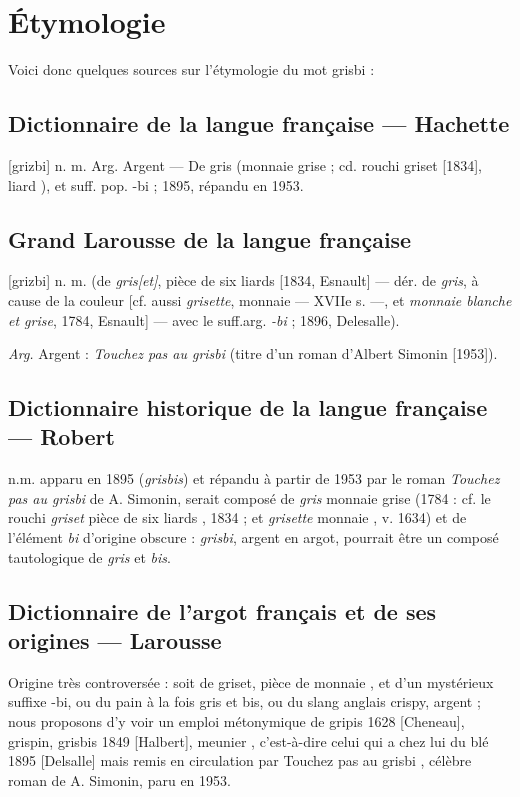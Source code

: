 \section*{Étymologie}


Voici donc quelques sources sur l'étymologie du mot grisbi :


\subsection*{Dictionnaire de la langue française --- Hachette}

[grizbi] n. m. Arg. Argent --- De gris (monnaie grise ; cd. rouchi griset [1834], \og liard \fg{}), et suff. pop. -bi ; 1895, répandu en 1953.


\subsection*{Grand Larousse de la langue française}

[grizbi] n. m. (de \emph{gris[et]}, pièce de six liards [1834, Esnault] --- dér.
de \emph{gris}, à cause de la couleur [cf. aussi \emph{grisette}, \og monnaie \fg{} --- XVIIe s. ---, et \emph{monnaie blanche et grise}, 1784, Esnault] --- avec le suff.arg. \emph{-bi} ; 1896, Delesalle).

\emph{Arg.} Argent : \emph{Touchez pas au grisbi} (titre d'un roman d'Albert
Simonin [1953]).


\subsection*{Dictionnaire historique de la langue française --- Robert}

n.m. apparu en 1895 (\emph{grisbis}) et répandu à partir de 1953 par le roman
\emph{Touchez pas au grisbi} de A. Simonin, serait composé de \emph{gris}
\og monnaie grise \fg{} (1784 : cf. le rouchi \emph{griset} \og pièce de six liards \fg{}, 1834 ; et \emph{grisette} \og monnaie \fg{}, v. 1634) et de l'élément \emph{bi} d'origine obscure : \emph{grisbi}, \og argent \fg{} en argot, pourrait être un composé tautologique de \emph{gris} et \emph{bis}.


\subsection*{Dictionnaire de l'argot français et de ses origines --- Larousse}

Origine très controversée : soit de griset, \og pièce de monnaie \fg, et d'un
mystérieux suffixe -bi, ou du pain à la fois gris et bis, ou du slang anglais
crispy, argent ; nous proposons d'y voir un emploi métonymique de gripis 1628
[Cheneau], grispin, grisbis 1849 [Halbert], \og meunier \fg{}, c'est-à-dire \og celui qui a chez lui du blé \fg{} 1895 [Delsalle] mais remis en circulation par \og Touchez pas au grisbi \fg{}, célèbre roman de A. Simonin, paru en 1953.

